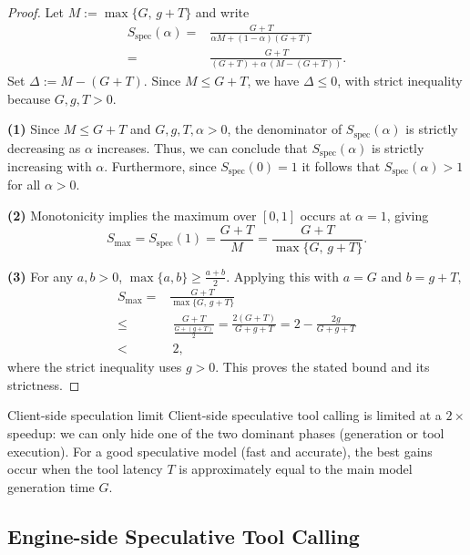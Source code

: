 \begin{proof}
Let $M:=\max\{G,\,g+T\}$ and write
\begin{align}
S_{\mathrm{spec}}(\alpha) =& \frac{G+T}{\alpha M+(1-\alpha)(G+T)} \nonumber \\
=& \frac{G+T}{(G+T)+\alpha\,(M-(G+T))}. \nonumber 
\end{align}
Set $\Delta:=M-(G+T)$. Since $M\le G+T$, we have $\Delta\le 0$, with strict inequality because $G,g,T>0$.

\smallskip
\noindent\textbf{(1)} Since $M\le G+T$ and $G,g,T,\alpha>0$, the denominator of $S_{\mathrm{spec}}(\alpha)$ is strictly decreasing as $\alpha$ increases.
Thus, we can conclude that $S_{\mathrm{spec}}(\alpha)$ is strictly increasing with $\alpha$. Furthermore, since $S_{\mathrm{spec}}(0)=1$ it follows that $S_{\mathrm{spec}}(\alpha)>1$ for all $\alpha>0$. 


\smallskip
\noindent\textbf{(2)} Monotonicity implies the maximum over $[0,1]$ occurs at $\alpha=1$, giving
\[
S_{\max}=S_{\mathrm{spec}}(1)=\frac{G+T}{M}=\frac{G+T}{\max\{G,\,g+T\}}.
\]

\smallskip
\noindent\textbf{(3)} For any $a,b>0$, $\max\{a,b\}\ge \tfrac{a+b}{2}$. 
Applying this with $a=G$ and $b=g+T$,
\begin{align}
S_{\max} =& \frac{G+T}{\max\{G,\,g+T\}} \nonumber \\
\le& \ \frac{G+T}{\tfrac{G+(g+T)}{2}}
= \frac{2(G+T)}{G+g+T}
= 2-\frac{2g}{G+g+T} \nonumber \\
<& \  2, \nonumber
\end{align}
where the strict inequality uses $g>0$. This proves the stated bound and its strictness.
\end{proof}

\begin{observationbox}{Client-side speculation limit}
Client-side speculative tool calling is limited at a $2\times$ speedup: we can only
hide one of the two dominant phases (generation or tool execution). 
For a good speculative model (fast and accurate), the best gains occur when the tool latency $T$ is approximately equal to the main model generation time $G$.
\end{observationbox}



\subsection{Engine-side Speculative Tool Calling}\label{sec:spec-tool:prefill}


